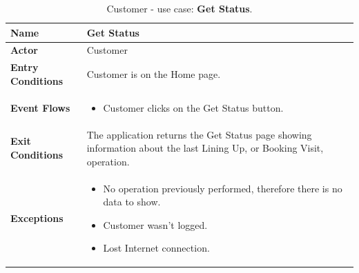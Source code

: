 \begin{table}[H]
    \centering
    \begin{tabular}{| m{} | m{} |}
        \hline
        \textbf{Name}            & Get Status                                                                                                             \\
        \hline
        \textbf{Actor}            & Customer                                                                                                               \\
        \hline
        \textbf{Entry Conditions} & Customer is on the Home page.                                                                                          \\
        \hline
        \textbf{Event Flows} &
        \begin{itemize}
            \item Customer clicks on the Get Status button.
        \end{itemize} \\
        \hline
        \textbf{Exit Conditions}  & The application returns the Get Status page showing information about the last Lining Up, or Booking Visit, operation. \\
        \hline
        \textbf{Exceptions} &
        \begin{itemize}
            \item No operation previously performed, therefore there is no data to show.
            \item Customer wasn't logged.
            \item Lost Internet connection.
        \end{itemize} \\
        \hline
    \end{tabular}
    \caption{Customer - use case: \textbf{Get Status}.}
    \label{tableGetStatus}
\end{table}

